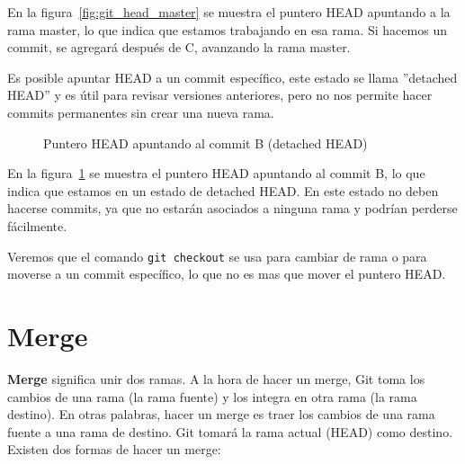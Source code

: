 \documentclass{apuntes_itsv}
\begin{document}
En la figura~\ref{fig:git_head_master} se muestra el puntero HEAD apuntando a la rama master, lo que indica
que estamos trabajando en esa rama. Si hacemos un commit, se agregará después de C, avanzando la rama master.

Es posible apuntar HEAD a un commit específico, este estado se llama ''detached HEAD'' y es útil para revisar versiones anteriores,
pero no nos permite hacer commits permanentes sin crear una nueva rama.

\begin{figure}[h]
  \centering
  \caption{Puntero HEAD apuntando al commit B (detached HEAD)}
  \label{fig:git_head_B}
\end{figure}

En la figura~\ref{fig:git_head_B} se muestra el puntero HEAD apuntando al commit B, lo que indica que estamos
en un estado de detached HEAD. En este estado no deben hacerse commits, ya que no estarán asociados a ninguna
rama y podrían perderse fácilmente.

Veremos que el comando \texttt{git checkout} se usa para cambiar de rama o para moverse a un commit específico, lo que no es mas que
mover el puntero HEAD.

\section{Merge}

\textbf{Merge} significa unir dos ramas. A la hora de hacer un merge, Git toma los cambios de una rama (la rama fuente)
y los integra en otra rama (la rama destino). En otras palabras, hacer un merge es traer los cambios de una rama fuente
a una rama de destino. Git tomará la rama actual (HEAD) como destino.
Existen dos formas de hacer un merge:
\end{document}
